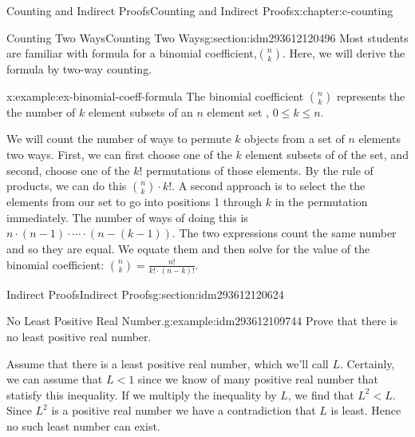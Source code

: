 \documentclass[twoside,10pt,]{book}
\numberwithin{equation}{section}
\newcommand{\lt}{<}
\begin{document}
\begin{chapterptx}{Counting and Indirect Proofs}{}{Counting and Indirect Proofs}{}{}{x:chapter:c-counting}
%
%
\typeout{************************************************}
\typeout{************************************************}
%
\begin{sectionptx}{Counting Two Ways}{}{Counting Two Ways}{}{}{g:section:idm293612120496}
Most students are familiar with formula for a binomial coefficient,\(\binom{n}{k}\). Here, we will derive the formula by two-way counting.%
\begin{example}{}{x:example:ex-binomial-coeff-formula}%
The binomial coefficient \(\binom{n}{k}\) represents the  the number of \(k\) element subsets of an \(n\) element set , \(0\leq k\leq n\).%
\par
We will count the number of ways to permute \(k\)  objects from a set of \(n\) elements two ways.  First, we can first choose one of the \(k\) element subsets of of the set, and second, choose one of the \(k!\)  permutations of those elements. By the rule of products, we can do this \(\binom{n}{k} \cdot k!\).  A second approach is to select the the elements from our set to go into positions 1 through \(k\) in the permutation immediately.  The number of ways of doing this is \(n \cdot (n-1)\cdot \cdots \cdot (n-(k-1))\).   The two expressions count the same number and so they are equal. We equate them and then solve for the value of the  binomial coefficient:  \(\binom{n}{k} =\frac{n!}{k! \cdot (n-k)!}\).%
\end{example}
\end{sectionptx}
%
%
\typeout{************************************************}
\typeout{************************************************}
%
\begin{sectionptx}{Indirect Proofs}{}{Indirect Proofs}{}{}{g:section:idm293612120624}
\begin{example}{No Least Positive Real Number.}{g:example:idm293612109744}%
Prove that there is no least positive real number.%
\par
Assume that there is a least positive real number, which we'll call \(L\).  Certainly, we can assume that \(L \lt 1\) since we know of many positive real number that statisfy this inequality.  If we multiply the inequality by \(L\), we find that \(L^2 \lt L\).  Since \(L^2\) is a positive real number we have a contradiction that \(L\) is least.  Hence no such least number can exist.%
\end{example}

\end{sectionptx}
\end{chapterptx}
\end{document}
